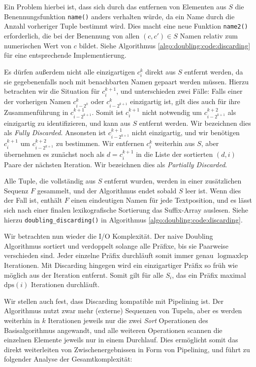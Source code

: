 Ein Problem hierbei ist, dass sich durch das entfernen von Elementen aus $S$ die Benennungsfunktion \texttt{name()} anders verhalten würde, da ein Name durch die Anzahl vorheriger Tuple bestimmt wird. Dies macht eine neue Funktion \texttt{name2()} erforderlich, die bei der Benennung von allen $(c, c') \in S$ Namen relativ zum numerischen Wert von $c$ bildet. Siehe Algorithmus \ref{algo:doubling:code:discarding} für eine entsprechende Implementierung.

Es dürfen außerdem nicht alle einzigartigen $c_i^k$ direkt aus $S$ entfernt werden, da sie gegebenenfalls noch mit benachbarten Namen gepaart werden müssen. Hierzu betrachten wir die Situation für $c_i^{k+1}$, und unterschieden zwei Fälle: Falls einer der vorherigen Namen $c_{i - 2^k}^k$ oder $c_{i - 2^{k+1}}^k$ einzigartig ist, gilt dies auch für ihre Zusammenführung in $c_{i - 2^{k+1}}^{k+1}$. Somit ist $c_i^{k+1}$ nicht notwendig um $c_{i - 2^{k+1}}^{k+2}$ als einzigartig zu identifizieren, und kann aus $S$ entfernt werden. Wir bezeichnen dies als \textit{Fully Discarded}. Ansonsten ist $c_{i - 2^{k+1}}^{k+1}$ nicht einzigartig, und wir benötigen $c_i^{k+1}$ um $c_{i - 2^{k+1}}^{k+2}$ zu bestimmen. Wir entfernen $c_i^k$ weiterhin aus $S$, aber übernehmen es zunächst noch als $d = c_i^{k+1}$ in die Liste der sortierten $(d, i)$ Paare der nächsten Iteration. Wir bezeichnen dies als \textit{Partially Discarded}.

Alle Tuple, die vollständig aus $S$ entfernt wurden, werden in einer zusätzlichen Sequenz $F$ gesammelt, und der Algorithmus endet sobald $S$ leer ist. Wenn dies der Fall ist, enthält $F$ einen eindeutigen Namen für jede Textposition, und es lässt sich nach einer finalen lexikografische Sortierung das Suffix-Array auslesen. Siehe hierzu \texttt{doubling\_discarding()} in Algorithmus \ref{algo:doubling:code:discarding}.

Wir betrachten nun wieder die I/O Komplexität. Der naive Doubling Algorithmus sortiert und verdoppelt solange alle Präfixe, bis sie Paarweise verschieden sind. Jeder einzelne Präfix durchläuft somit immer genau $\log \text{maxlcp}$ Iterationen. Mit Discarding hingegen wird ein einzigartiger Präfix so früh wie möglich aus der Iteration entfernt. Somit gilt für alle $S_i$, das ein Präfix maximal $\text{dps}(i)$ Iterationen durchläuft.

Wir stellen auch fest, dass Discarding kompatible mit Pipelining ist. Der Algorithmus nutzt zwar mehr (externe) Sequenzen von Tupeln, aber es werden weiterhin in $k$ Iterationen jeweils nur die zwei \textit{Sort} Operationen des Basisalgorithmus angewandt, und alle weiteren Operationen scannen die einzelnen Elemente jeweils nur in einem Durchlauf. Dies ermöglicht somit das direkt weiterleiten von Zwischenergebnissen in Form von Pipelining, und führt zu folgender Analyse der Gesamtkomplexität:

